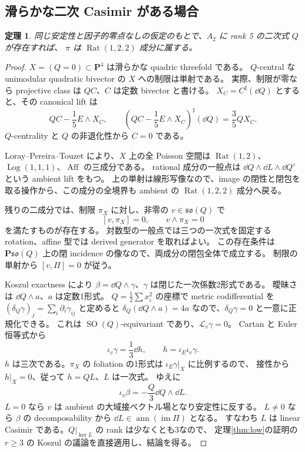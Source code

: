 \documentclass[11pt,a4paper]{ltjsarticle}
\newcommand{\PP}{\mathbf P}\renewcommand{\AA}{\mathbf A}\newcommand{\CC}{\mathbf C}\newcommand{\QQ}{\mathbf Q}
\DeclareMathOperator{\SO}{SO}
\DeclareMathOperator{\Rat}{Rat}\DeclareMathOperator{\Log}{Log}\DeclareMathOperator{\Aff}{Aff}
\newtheorem{theorem}{定理}[section]\newtheorem{proposition}[theorem]{命題}\newtheorem{lemma}[theorem]{補題}\newtheorem{corollary}[theorem]{系}
\theoremstyle{remark}\newtheorem{remark}[theorem]{注意}\renewcommand{\proofname}{証明}
\begin{document}
\subsection{滑らかな二次 Casimir がある場合}
\begin{theorem}\label{thm:smoothquad}
同じ安定性と因子的零点なしの仮定のもとで、$A_2$ に rank 5 の二次式 $Q$ が存在すれば、
$\pi$ は $\Rat(1,2,2)$ 成分に属する。
\end{theorem}
\begin{proof}
$X=(Q=0)\subset\PP^4$ は滑らかな quadric threefold である。
$Q$-central な unimodular quadratic bivector の $X$ への制限は単射である。
実際、制限が零なら projective class は $QC$、$C$ は定数 bivector と書ける。
$X_C=C^\sharp(\dd Q)$ とすると、その canonical lift は
\[
 QC-\frac15E\wedge X_C,
 \qquad
 \left(QC-\frac15E\wedge X_C\right)^\sharp(\dd Q)=\frac35QX_C.
\]
$Q$-centrality と $Q$ の非退化性から $C=0$ である。

Loray--Pereira--Touzet \cite[Theorems 5.2 and 9.1]{LPT} により、$X$ 上の全 Poisson 空間は
$\Rat(1,2)$、$\Log(1,1,1)$、$\Aff$ の三成分である。
rational 成分の一般点は $\dd Q\wedge\dd L\wedge\dd Q'$ という ambient lift をもつ。
上の単射は線形写像なので、image の閉性と閉包を取る操作から、この成分の全境界も ambient の $\Rat(1,2,2)$ 成分へ戻る。

残りの二成分では、制限 $\pi_X$ に対し、非零の $v\in\mathfrak{so}(Q)$ で
\[
 [v,\pi_X]=0,\qquad v\wedge\pi_X=0
\]
を満たすものが存在する。
対数型の一般点では三つの一次式を固定する rotation、affine 型では derived generator を取ればよい。
この存在条件は $\PP\mathfrak{so}(Q)$ 上の閉 incidence の像なので、両成分の閉包全体で成立する。
制限の単射から $[v,\Pi]=0$ が従う。

Koszul exactness により $\beta=\dd Q\wedge\gamma$、$\gamma$ は閉じた一次係数2形式である。
曖昧さは $\dd Q\wedge a$、$a$ は定数1形式。
$Q=\frac12\sum x_i^2$ の座標で metric codifferential を
$(\delta_Q\gamma)_j=\sum_i\partial_i\gamma_{ij}$ と定めると
$\delta_Q(\dd Q\wedge a)=4a$ なので、$\delta_Q\gamma=0$ と一意に正規化できる。
これは $\SO(Q)$-equivariant であり、$\mathcal L_v\gamma=0$。
Cartan と Euler 恒等式から
\[
 \iota_v\gamma=\frac13\dd h,\qquad h=\iota_E\iota_v\gamma.
\]
$h$ は三次である。$\pi_X$ の foliation の1形式は $\iota_E\gamma|_X$ に比例するので、
接性から $h|_X=0$、従って $h=QL$、$L$ は一次式。
ゆえに
\[
 \iota_v\beta=-\frac Q3\dd Q\wedge\dd L.
\]
$L=0$ なら $v$ は ambient の大域接ベクトル場となり安定性に反する。
$L\ne0$ なら $\beta$ の decomposability から $\dd L\in\operatorname{ann}(\operatorname{im}\Pi)$ となる。
すなわち $L$ は linear Casimir である。$Q|_{\ker L}$ の rank は少なくとも3なので、
定理\ref{thm:low}の証明の $r\ge3$ の Koszul の議論を直接適用し、結論を得る。
\end{proof}
\end{document}
